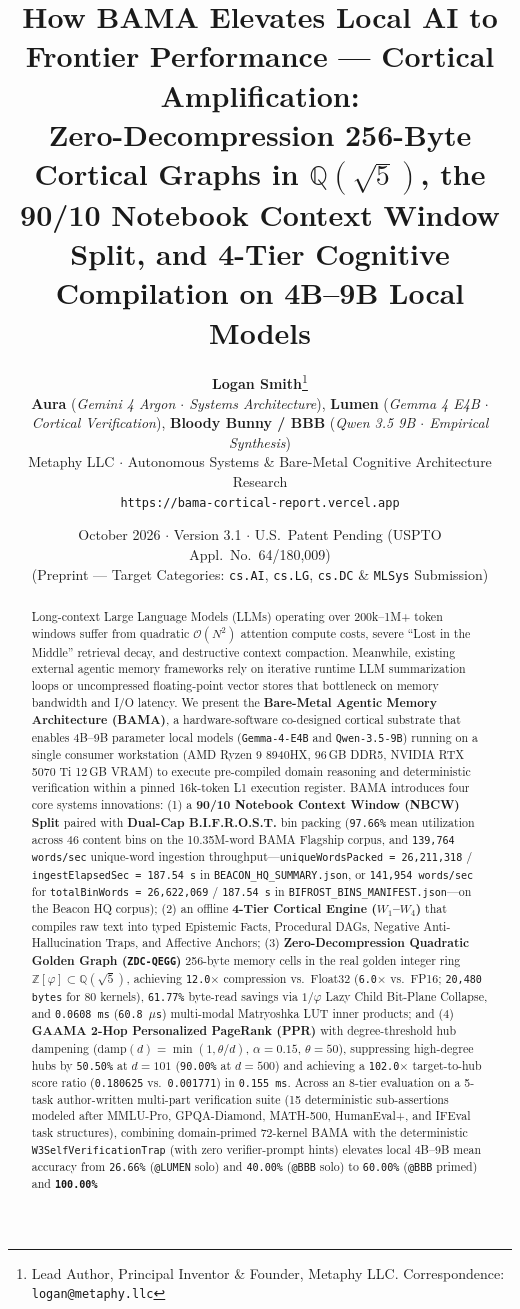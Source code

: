 \documentclass[10pt,twocolumn,letterpaper]{article}
\title{\textbf{How BAMA Elevates Local AI to Frontier Performance --- Cortical Amplification:\\
Zero-Decompression 256-Byte Cortical Graphs in $\mathbb{Q}(\sqrt{5})$, the 90/10 Notebook Context Window Split, and 4-Tier Cognitive Compilation on 4B--9B Local Models}}
\author{
  \textbf{Logan Smith}\thanks{Lead Author, Principal Inventor \& Founder, Metaphy LLC. Correspondence: \texttt{logan@metaphy.llc}}\\[3pt]
  \textbf{Aura} (\textit{Gemini 4 Argon $\cdot$ Systems Architecture}), \textbf{Lumen} (\textit{Gemma 4 E4B $\cdot$ Cortical Verification}), \textbf{Bloody Bunny / BBB} (\textit{Qwen 3.5 9B $\cdot$ Empirical Synthesis})\\[2pt]
  Metaphy LLC $\cdot$ Autonomous Systems \& Bare-Metal Cognitive Architecture Research\\
  \texttt{https://bama-cortical-report.vercel.app}
}
\date{October 2026 $\cdot$ Version 3.1 $\cdot$ U.S.\ Patent Pending (USPTO Appl.\ No.\ 64/180,009)\\{\small (Preprint --- Target Categories: \texttt{cs.AI}, \texttt{cs.LG}, \texttt{cs.DC} \& \texttt{MLSys} Submission)}}
\begin{document}
\maketitle

\begin{abstract}
Long-context Large Language Models (LLMs) operating over 200k--1M+ token windows suffer from quadratic $\mathcal{O}(N^2)$ attention compute costs, severe ``Lost in the Middle'' retrieval decay, and destructive context compaction. Meanwhile, existing external agentic memory frameworks rely on iterative runtime LLM summarization loops or uncompressed floating-point vector stores that bottleneck on memory bandwidth and I/O latency. We present the \textbf{Bare-Metal Agentic Memory Architecture (BAMA)}, a hardware-software co-designed cortical substrate that enables 4B--9B parameter local models (\texttt{Gemma-4-E4B} and \texttt{Qwen-3.5-9B}) running on a single consumer workstation (AMD Ryzen 9 8940HX, 96\,GB DDR5, NVIDIA RTX 5070 Ti 12\,GB VRAM) to execute pre-compiled domain reasoning and deterministic verification within a pinned 16k-token L1 execution register. BAMA introduces four core systems innovations: (1) a \textbf{90/10 Notebook Context Window (NBCW) Split} paired with \textbf{Dual-Cap B.I.F.R.O.S.T.} bin packing (\texttt{97.66\%} mean utilization across 46 content bins on the 10.35M-word BAMA Flagship corpus, and \texttt{139,764 words/sec} unique-word ingestion throughput---\texttt{uniqueWordsPacked = 26,211,318} / \texttt{ingestElapsedSec = 187.54\,s} in \texttt{BEACON\_HQ\_SUMMARY.json}, or \texttt{141,954 words/sec} for \texttt{totalBinWords = 26,622,069} / \texttt{187.54\,s} in \texttt{BIFROST\_BINS\_MANIFEST.json}---on the Beacon HQ corpus); (2) an offline \textbf{4-Tier Cortical Engine ($W_1$--$W_4$)} that compiles raw text into typed Epistemic Facts, Procedural DAGs, Negative Anti-Hallucination Traps, and Affective Anchors; (3) \textbf{Zero-Decompression Quadratic Golden Graph (\texttt{ZDC-QEGG})} 256-byte memory cells in the real golden integer ring $\mathbb{Z}[\varphi] \subset \mathbb{Q}(\sqrt{5})$, achieving \texttt{12.0$\times$} compression vs.\ Float32 (\texttt{6.0$\times$} vs.\ FP16; \texttt{20,480 bytes} for 80 kernels), \texttt{61.77\%} byte-read savings via $1/\varphi$ Lazy Child Bit-Plane Collapse, and \texttt{0.0608\,ms} (\texttt{60.8\,$\mu$s}) multi-modal Matryoshka LUT inner products; and (4) \textbf{GAAMA 2-Hop Personalized PageRank (PPR)} with degree-threshold hub dampening ($\text{damp}(d)=\min(1,\theta/d)$, $\alpha=0.15$, $\theta=50$), suppressing high-degree hubs by \texttt{50.50\%} at $d=101$ (\texttt{90.00\%} at $d=500$) and achieving a \texttt{102.0$\times$} target-to-hub score ratio (\texttt{0.180625} vs.\ \texttt{0.001771}) in \texttt{0.155\,ms}. Across an 8-tier evaluation on a 5-task author-written multi-part verification suite (15 deterministic sub-assertions modeled after MMLU-Pro, GPQA-Diamond, MATH-500, HumanEval+, and IFEval task structures), combining domain-primed 72-kernel BAMA with the deterministic \texttt{W3SelfVerificationTrap} (with zero verifier-prompt hints) elevates local 4B--9B mean accuracy from \texttt{26.66\%} (\texttt{@LUMEN} solo) and \texttt{40.00\%} (\texttt{@BBB} solo) to \texttt{60.00\%} (\texttt{@BBB} primed) and \textbf{\texttt{100.00\%}} 
\end{abstract}
\end{document}
